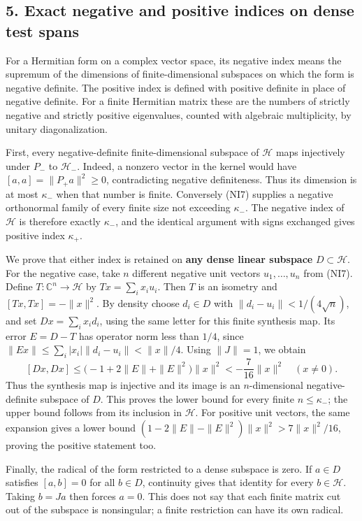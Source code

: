\documentclass[
  10pt,
  a4paper,
]{article}
\begin{document}
\subsection{5. Exact negative and positive indices on dense test
spans}\label{exact-negative-and-positive-indices-on-dense-test-spans}

For a Hermitian form on a complex vector space, its negative index means
the supremum of the dimensions of finite-dimensional subspaces on which
the form is negative definite. The positive index is defined with
positive definite in place of negative definite. For a finite Hermitian
matrix these are the numbers of strictly negative and strictly positive
eigenvalues, counted with algebraic multiplicity, by unitary
diagonalization.

First, every negative-definite finite-dimensional subspace of
\(\mathcal H\) maps injectively under \(P_-\) to \(\mathcal H_-\).
Indeed, a nonzero vector in the kernel would have
\([a,a]=\|P_+a\|^2\ge0\), contradicting negative definiteness. Thus its
dimension is at most \(\kappa_-\) when that number is finite. Conversely
(NI7) supplies a negative orthonormal family of every finite size not
exceeding \(\kappa_-\). The negative index of \(\mathcal H\) is
therefore exactly \(\kappa_-\), and the identical argument with signs
exchanged gives positive index \(\kappa_+\).

We prove that either index is retained on \textbf{any dense linear
subspace} \(D\subset\mathcal H\). For the negative case, take \(n\)
different negative unit vectors \(u_1,\ldots,u_n\) from (NI7). Define
\(T:\mathbb C^n\to\mathcal H\) by \(Tx=\sum_i x_i u_i\). Then \(T\) is
an isometry and \([Tx,Tx]=-\|x\|^2\). By density choose \(d_i\in D\)
with \(\|d_i-u_i\|<1/(4\sqrt n)\), and set \(Dx=\sum_i x_i d_i\), using
the same letter for this finite synthesis map. Its error \(E=D-T\) has
operator norm less than \(1/4\), since
\(\|Ex\|\le\sum_i|x_i|\|d_i-u_i\|<\|x\|/4\). Using \(\|J\|=1\), we
obtain \[
[Dx,Dx]\le
\bigl(-1+2\|E\|+\|E\|^2\bigr)\|x\|^2
<-\frac7{16}\|x\|^2\quad(x\ne0).
\tag{NI21}
\] Thus the synthesis map is injective and its image is an
\(n\)-dimensional negative-definite subspace of \(D\). This proves the
lower bound for every finite \(n\le\kappa_-\); the upper bound follows
from its inclusion in \(\mathcal H\). For positive unit vectors, the
same expansion gives a lower bound
\((1-2\|E\|-\|E\|^2)\|x\|^2>7\|x\|^2/16\), proving the positive
statement too.

Finally, the radical of the form restricted to a dense subspace is zero.
If \(a\in D\) satisfies \([a,b]=0\) for all \(b\in D\), continuity gives
that identity for every \(b\in\mathcal H\). Taking \(b=Ja\) then forces
\(a=0\). This does not say that each finite matrix cut out of the
subspace is nonsingular; a finite restriction can have its own radical.
\end{document}
